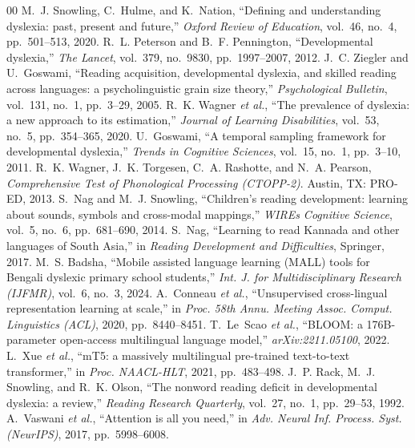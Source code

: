 \documentclass[preprint,12pt]{elsarticle}
\begin{document}
\begin{thebibliography}{00}
 M.~J. Snowling, C.~Hulme, and K.~Nation, ``Defining and understanding dyslexia: past, present and future,'' \emph{Oxford Review of Education}, vol.~46, no.~4, pp.~501--513, 2020.
 R.~L. Peterson and B.~F. Pennington, ``Developmental dyslexia,'' \emph{The Lancet}, vol.~379, no.~9830, pp.~1997--2007, 2012.
 J.~C. Ziegler and U.~Goswami, ``Reading acquisition, developmental dyslexia, and skilled reading across languages: a psycholinguistic grain size theory,'' \emph{Psychological Bulletin}, vol.~131, no.~1, pp.~3--29, 2005.
 R.~K. Wagner \emph{et al.}, ``The prevalence of dyslexia: a new approach to its estimation,'' \emph{Journal of Learning Disabilities}, vol.~53, no.~5, pp.~354--365, 2020.
 U.~Goswami, ``A temporal sampling framework for developmental dyslexia,'' \emph{Trends in Cognitive Sciences}, vol.~15, no.~1, pp.~3--10, 2011.
 R.~K. Wagner, J.~K. Torgesen, C.~A. Rashotte, and N.~A. Pearson, \emph{Comprehensive Test of Phonological Processing (CTOPP-2)}. Austin, TX: PRO-ED, 2013.
 S.~Nag and M.~J. Snowling, ``Children's reading development: learning about sounds, symbols and cross-modal mappings,'' \emph{WIREs Cognitive Science}, vol.~5, no.~6, pp.~681--690, 2014.
 S.~Nag, ``Learning to read Kannada and other languages of South Asia,'' in \emph{Reading Development and Difficulties}, Springer, 2017.
 M.~S. Badsha, ``Mobile assisted language learning (MALL) tools for Bengali dyslexic primary school students,'' \emph{Int. J. for Multidisciplinary Research (IJFMR)}, vol.~6, no.~3, 2024.
 A.~Conneau \emph{et al.}, ``Unsupervised cross-lingual representation learning at scale,'' in \emph{Proc. 58th Annu. Meeting Assoc. Comput. Linguistics (ACL)}, 2020, pp.~8440--8451.
 T.~Le~Scao \emph{et al.}, ``BLOOM: a 176B-parameter open-access multilingual language model,'' \emph{arXiv:2211.05100}, 2022.
 L.~Xue \emph{et al.}, ``mT5: a massively multilingual pre-trained text-to-text transformer,'' in \emph{Proc. NAACL-HLT}, 2021, pp.~483--498.
 J.~P. Rack, M.~J. Snowling, and R.~K. Olson, ``The nonword reading deficit in developmental dyslexia: a review,'' \emph{Reading Research Quarterly}, vol.~27, no.~1, pp.~29--53, 1992.
 A.~Vaswani \emph{et al.}, ``Attention is all you need,'' in \emph{Adv. Neural Inf. Process. Syst. (NeurIPS)}, 2017, pp.~5998--6008.

\end{thebibliography}
\end{document}

